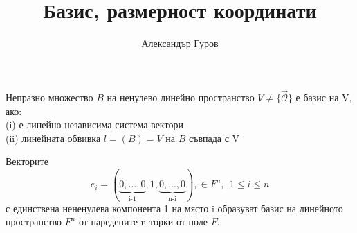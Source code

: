 \documentclass{article}
\title{Базис, размерност координати}
\author{Александър Гуров}
\date{\datebulgarian{\today}}
\begin{document}
\maketitle
\begin{tcolorbox}[title = Определение 5.1, colframe = red!70!black, colback = red!10!white]
    Непразно множество $B$ на ненулево линейно пространство $V \neq \{\vec{\mathcal{O}} \}$ е
    базис на V, ако:\\
    (i) е линейно независима система вектори\\
    (ii) линейната обвивка $l=(B)=V$ на $B$ съвпада с V
\end{tcolorbox}
\begin{tcolorbox}[title = Пример 5.2, colframe = green!70!black, colback = green!10!white]
    Векторите
    \[
        e_i=(\underbrace{0,...,0}_\text{i-1},1,\underbrace{0,...,0}_\text{n-i}), \in F^n, \ \ 1\leq i\leq n
    \]
    с единствена нененулева компонента 1 на място i образуват базис на линейното пространство
    $F^n$ от наредените n-торки от поле $F$.
\end{tcolorbox}
\end{document}
